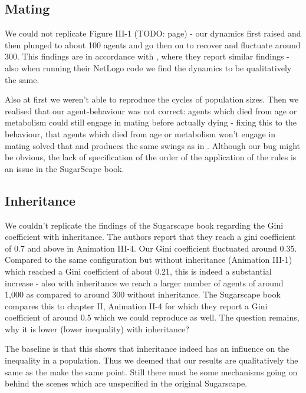
\subsection{Mating}
We could not replicate Figure III-1 (TODO: page) - our dynamics first raised and then plunged to about 100 agents and go then on to recover and fluctuate around 300. This findings are in accordance with \cite{weaver_replicating_2009}, where they report similar findings - also when running their NetLogo code we find the dynamics to be qualitatively the same.

Also at first we weren't able to reproduce the cycles of population sizes. Then we realised that our agent-behaviour was not correct: agents which died from age or metabolism could still engage in mating before actually dying - fixing this to the behaviour, that agents which died from age or metabolism won't engage in mating solved that and produces the same swings as in \cite{weaver_replicating_2009}. Although our bug might be obvious, the lack of specification of the order of the application of the rules is an issue in the SugarScape book.

\subsection{Inheritance}
We couldn't replicate the findings of the Sugarscape book regarding the Gini coefficient with inheritance. The authors report that they reach a gini coefficient of 0.7 and above in Animation III-4. Our Gini coefficient fluctuated around 0.35. Compared to the same configuration but without inheritance (Animation III-1) which reached a Gini coefficient of about 0.21, this is indeed a substantial increase - also with inheritance we reach a larger number of agents of around 1,000 as compared to around 300 without inheritance.
The Sugarscape book compares this to chapter II, Animation II-4 for which they report a Gini coefficient of around 0.5 which we could reproduce as well. The question remains, why it is lower (lower inequality) with inheritance?

The baseline is that this shows that inheritance indeed has an influence on the inequality in a population. Thus we deemed that our results are qualitatively the same as the make the same point. Still there must be some mechanisms going on behind the scenes which are unspecified in the original Sugarscape.

